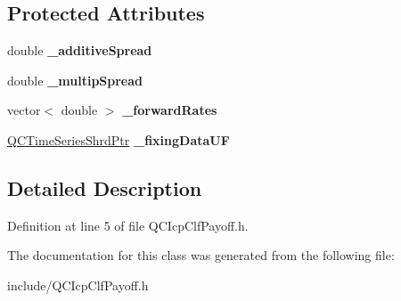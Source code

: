 \subsection*{Protected Attributes}
\begin{DoxyCompactItemize}
\item 
\hypertarget{class_q_c_icp_clf_payoff_a038f8186cfc33b972362c8eb4843b3b8}{double {\bfseries \+\_\+additive\+Spread}}\label{class_q_c_icp_clf_payoff_a038f8186cfc33b972362c8eb4843b3b8}

\item 
\hypertarget{class_q_c_icp_clf_payoff_acd6dfaf17c08d75c978d1077ce713bc2}{double {\bfseries \+\_\+multip\+Spread}}\label{class_q_c_icp_clf_payoff_acd6dfaf17c08d75c978d1077ce713bc2}

\item 
\hypertarget{class_q_c_icp_clf_payoff_a4d724785270e7434537d2d7bfe5ef90f}{vector$<$ double $>$ {\bfseries \+\_\+forward\+Rates}}\label{class_q_c_icp_clf_payoff_a4d724785270e7434537d2d7bfe5ef90f}

\item 
\hypertarget{class_q_c_icp_clf_payoff_a866088bdf4d4aaba48b96e6f97b0a7a6}{\hyperlink{_q_c_definitions_8h_a6a601ffd693c05dd81309e3dca08b8f5}{Q\+C\+Time\+Series\+Shrd\+Ptr} {\bfseries \+\_\+fixing\+Data\+U\+F}}\label{class_q_c_icp_clf_payoff_a866088bdf4d4aaba48b96e6f97b0a7a6}

\end{DoxyCompactItemize}


\subsection{Detailed Description}


Definition at line 5 of file Q\+C\+Icp\+Clf\+Payoff.\+h.



The documentation for this class was generated from the following file\+:\begin{DoxyCompactItemize}
\item 
include/Q\+C\+Icp\+Clf\+Payoff.\+h\end{DoxyCompactItemize}
